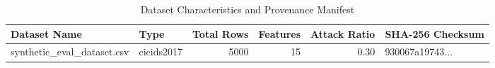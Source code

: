 \begin{table}[htbp]
\centering\small
\caption{Dataset Characteristics and Provenance Manifest}
\label{tab:dataset_manifest}
\begin{tabular}{l l r r r l}
\hline
\textbf{Dataset Name} & \textbf{Type} & \textbf{Total Rows} & \textbf{Features} & \textbf{Attack Ratio} & \textbf{SHA-256 Checksum} \\
\hline
synthetic_eval_dataset.csv & cicids2017 & 5000 & 15 & 0.30 & 930067a19743... \\
\hline
\end{tabular}
\end{table}